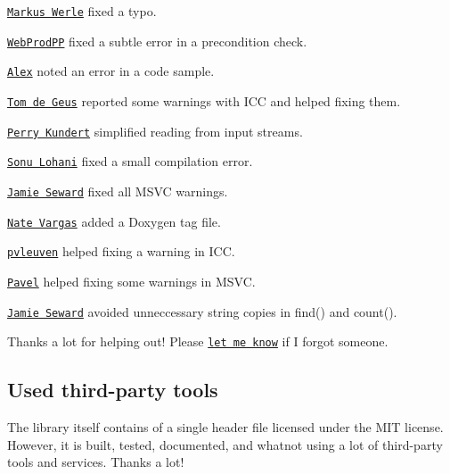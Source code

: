 \begin{DoxyItemize}
\item \href{https://github.com/daixtrose}{\tt Markus Werle} fixed a typo.
\item \href{https://github.com/WebProdPP}{\tt Web\+Prod\+PP} fixed a subtle error in a precondition check.
\item \href{https://github.com/leha-bot}{\tt Alex} noted an error in a code sample.
\item \href{https://github.com/tdegeus}{\tt Tom de Geus} reported some warnings with I\+CC and helped fixing them.
\item \href{https://github.com/pjkundert}{\tt Perry Kundert} simplified reading from input streams.
\item \href{https://github.com/sonulohani}{\tt Sonu Lohani} fixed a small compilation error.
\item \href{https://github.com/jseward}{\tt Jamie Seward} fixed all M\+S\+VC warnings.
\item \href{https://github.com/eld00d}{\tt Nate Vargas} added a Doxygen tag file.
\item \href{https://github.com/pvleuven}{\tt pvleuven} helped fixing a warning in I\+CC.
\item \href{https://github.com/crea7or}{\tt Pavel} helped fixing some warnings in M\+S\+VC.
\item \href{https://github.com/jseward}{\tt Jamie Seward} avoided unneccessary string copies in {\ttfamily find()} and {\ttfamily count()}.
\end{DoxyItemize}

Thanks a lot for helping out! Please \href{mailto:mail@nlohmann.me}{\tt let me know} if I forgot someone.

\subsection*{Used third-\/party tools}

The library itself contains of a single header file licensed under the M\+IT license. However, it is built, tested, documented, and whatnot using a lot of third-\/party tools and services. Thanks a lot!


